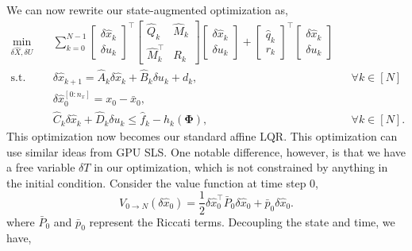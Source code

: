 \documentclass{article}
\begin{document}
We can now rewrite our state-augmented optimization as,
\begin{subequations} \label{eq:condensed_qp}
    \begin{align}
        \min_{\delta \hat X, \delta U} \quad & \sum_{k=0}^{N-1} \begin{bmatrix}
            \delta \hat x_k \\
            \delta u_k
        \end{bmatrix}^\top
        \begin{bmatrix}
            \hat Q_k & \hat M_k \\
            \hat M_k^\top & R_k
        \end{bmatrix} \begin{bmatrix}
            \delta \hat x_k \\
            \delta u_k
        \end{bmatrix}
        + \begin{bmatrix}
            \hat q_k \\
            r_k
        \end{bmatrix}^\top
        \begin{bmatrix}
            \delta \hat x_k \\
            \delta u_k
        \end{bmatrix} \\
        \text{s.t.} \quad & \delta \hat x_{k+1} = \hat{A}_{k} \delta \hat x_k + \hat B_k \delta u_k + d_k, && \forall k \in [N]\\
        & \delta \hat x_0^{[0:n_x]} = x_0 - \bar{x}_0, \\
        & \hat C_k \delta \hat x_k + \hat D_k \delta u_k \leq \hat f_k - h_k(\mathbf{\Phi}), && \forall k \in [N].
    \end{align}
\end{subequations}
This optimization now becomes our standard affine LQR. This optimization can use similar ideas from GPU SLS. One notable difference, however, is that we have a free variable $\delta T$ in our optimization, which is not constrained by anything in the initial condition. Consider the value function at time step 0,
\begin{equation}
    V_{0 \rightarrow N}(\delta \hat x_0) = \frac{1}{2} \delta \hat x_0^\top \bar P_0 \delta \hat x_0 + \bar p_0 \delta \hat x_0.
\end{equation}
where $\bar{P}_0$ and $\bar{p}_0$ represent the Riccati terms. Decoupling the state and time, we have,
\end{document}
